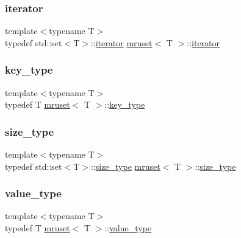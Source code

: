 \mbox{\label{classmruset_a246172eda1afff45be47a013c14b1ad6}} 
\subsubsection{\texorpdfstring{iterator}{iterator}}
{\footnotesize\ttfamily template$<$typename T$>$ \\
typedef std\+::set$<$T$>$\+::\mbox{\hyperlink{classmruset_a246172eda1afff45be47a013c14b1ad6}{iterator}} \mbox{\hyperlink{classmruset}{mruset}}$<$ T $>$\+::\mbox{\hyperlink{classmruset_a246172eda1afff45be47a013c14b1ad6}{iterator}}}

\mbox{\label{classmruset_a282941ee7f0438b0c09274b10c78cda0}} 
\subsubsection{\texorpdfstring{key\+\_\+type}{key\_type}}
{\footnotesize\ttfamily template$<$typename T$>$ \\
typedef T \mbox{\hyperlink{classmruset}{mruset}}$<$ T $>$\+::\mbox{\hyperlink{classmruset_a282941ee7f0438b0c09274b10c78cda0}{key\+\_\+type}}}

\mbox{\label{classmruset_aaee46af18d8a5bdc503e9570e499a335}} 
\subsubsection{\texorpdfstring{size\+\_\+type}{size\_type}}
{\footnotesize\ttfamily template$<$typename T$>$ \\
typedef std\+::set$<$T$>$\+::\mbox{\hyperlink{classmruset_aaee46af18d8a5bdc503e9570e499a335}{size\+\_\+type}} \mbox{\hyperlink{classmruset}{mruset}}$<$ T $>$\+::\mbox{\hyperlink{classmruset_aaee46af18d8a5bdc503e9570e499a335}{size\+\_\+type}}}

\mbox{\label{classmruset_a834c3e7f8e9cf615ebe27752443f9a3a}} 
\subsubsection{\texorpdfstring{value\+\_\+type}{value\_type}}
{\footnotesize\ttfamily template$<$typename T$>$ \\
typedef T \mbox{\hyperlink{classmruset}{mruset}}$<$ T $>$\+::\mbox{\hyperlink{classmruset_a834c3e7f8e9cf615ebe27752443f9a3a}{value\+\_\+type}}}



